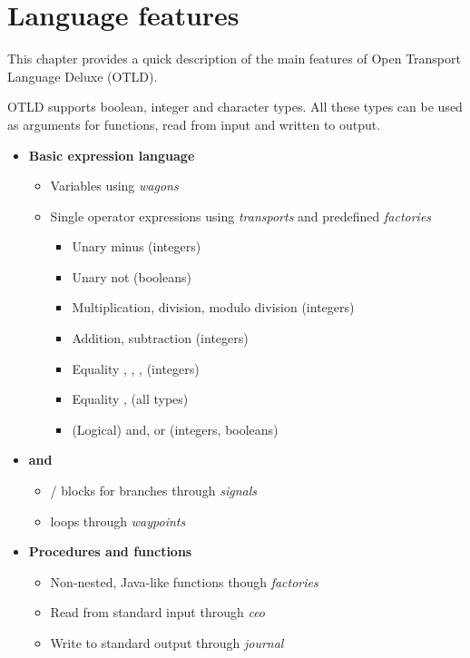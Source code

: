 \chapter{Language features}

This chapter provides a quick description of the main features of Open Transport Language Deluxe (OTLD).

OTLD supports boolean, integer and character types.
All these types can be used as arguments for functions, read from input and written to output.

\begin{itemize}
\item \textbf{Basic expression language}
	\begin{itemize}
	\item Variables using \emph{wagons}
	\item Single operator expressions using \emph{transports} and predefined \emph{factories}
		\begin{itemize}
		\item Unary minus (integers)
		\item Unary not (booleans)
		\item Multiplication, division, modulo division (integers)
		\item Addition, subtraction (integers)
		\item Equality \code{<}, \code{<=}, \code{>=}, \code{>} (integers)
		\item Equality \code{==}, \code{!=} (all types)
		\item (Logical) and, or (integers, booleans)
		\end{itemize}
	\end{itemize}
\item \textbf{ and }
	\begin{itemize}
	\item {} /  blocks for branches through \emph{signals}
	\item {} loops through \emph{waypoints}
	\end{itemize}
\item \textbf{Procedures and functions}
	\begin{itemize}
	\item Non-nested, Java-like functions though \emph{factories}
	\item Read from standard input through \emph{ceo}
	\item Write to standard output through \emph{journal}
	\end{itemize}
\end{itemize}
